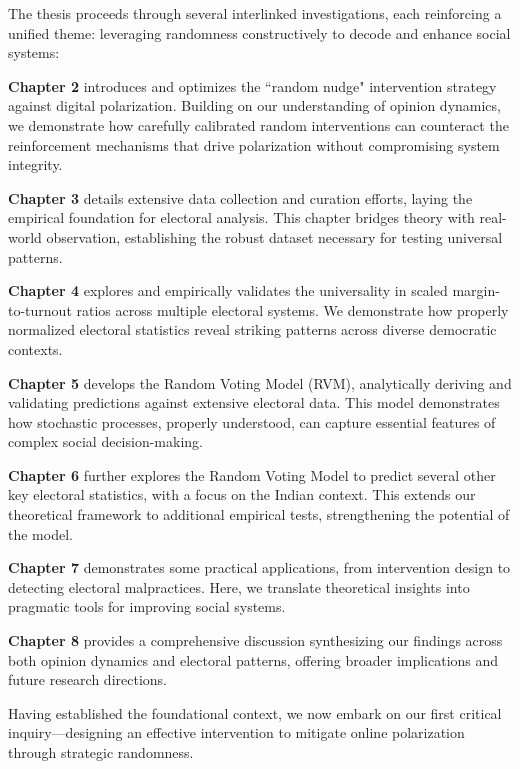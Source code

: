The thesis proceeds through several interlinked investigations, each reinforcing a unified theme: leveraging randomness constructively to decode and enhance social systems:

\textbf{Chapter 2} introduces and optimizes the ``random nudge" intervention strategy against digital polarization. Building on our understanding of opinion dynamics, we demonstrate how carefully calibrated random interventions can counteract the reinforcement mechanisms that drive polarization without compromising system integrity.

\textbf{Chapter 3} details extensive data collection and curation efforts, laying the empirical foundation for electoral analysis. This chapter bridges theory with real-world observation, establishing the robust dataset necessary for testing universal patterns.

\textbf{Chapter 4} explores and empirically validates the universality in scaled margin-to-turnout ratios across multiple electoral systems. We demonstrate how properly normalized electoral statistics reveal striking patterns across diverse democratic contexts.

\textbf{Chapter 5} develops the Random Voting Model (RVM), analytically deriving and validating predictions against extensive electoral data. This model demonstrates how stochastic processes, properly understood, can capture essential features of complex social decision-making.

\textbf{Chapter 6} further explores the Random Voting Model to predict several other key electoral statistics, with a focus on the Indian context. This extends our theoretical framework to additional empirical tests, strengthening the potential of the model.

\textbf{Chapter 7} demonstrates some practical applications, from intervention design to detecting electoral malpractices. Here, we translate theoretical insights into pragmatic tools for improving social systems.

\textbf{Chapter 8} provides a comprehensive discussion synthesizing our findings across both opinion dynamics and electoral patterns, offering broader implications and future research directions. \

Having established the foundational context, we now embark on our first critical inquiry—designing an effective intervention to mitigate online polarization through strategic randomness.